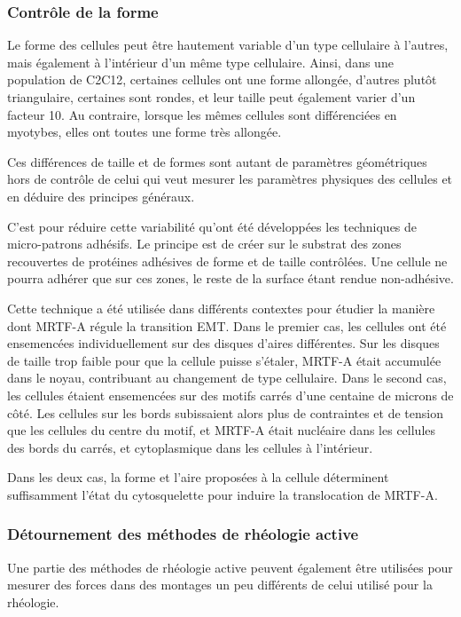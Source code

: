 \documentclass{report}
\begin{document}
\subsubsection{Contrôle de la forme}

Le forme des cellules peut être hautement variable d'un type cellulaire à l'autres, mais également à l'intérieur d'un même type cellulaire. 
Ainsi, dans une population de C2C12, certaines cellules ont une forme allongée, d'autres plutôt triangulaire, certaines sont rondes, et leur taille peut également varier d'un facteur 10. Au contraire, lorsque les mêmes cellules sont différenciées en myotybes, elles ont toutes une forme très allongée. 

Ces différences de taille et de formes sont autant de paramètres géométriques hors de contrôle de celui qui veut mesurer les paramètres physiques des cellules et en déduire des principes généraux. 

C'est pour réduire cette variabilité qu'ont été développées les techniques de micro-patrons adhésifs. 
Le principe est de créer sur le substrat des zones recouvertes de protéines adhésives de forme et de taille contrôlées.
Une cellule ne pourra adhérer que sur ces zones, le reste de la surface étant rendue non-adhésive. 

Cette technique a été utilisée dans différents contextes pour étudier la manière dont MRTF-A régule la transition EMT. 
Dans le premier cas, les cellules ont été ensemencées individuellement sur des disques d'aires différentes. Sur les disques de taille trop faible pour que la cellule puisse s'étaler, MRTF-A était accumulée dans le noyau, contribuant au changement de type cellulaire. 
Dans le second cas, les cellules étaient ensemencées sur des motifs carrés d'une centaine de microns de côté. Les cellules sur les bords subissaient alors plus de contraintes et de tension que les cellules du centre du motif, et MRTF-A était nucléaire dans les cellules des bords du carrés, et cytoplasmique dans les cellules à l'intérieur.

Dans les deux cas, la forme et l'aire proposées à la cellule déterminent suffisamment l'état du cytosquelette pour induire la translocation de MRTF-A.  

\subsubsection{Détournement des méthodes de rhéologie active}

Une partie des méthodes de rhéologie active peuvent également être utilisées pour mesurer des forces dans des montages un peu différents de celui utilisé pour la rhéologie. 
\end{document}
